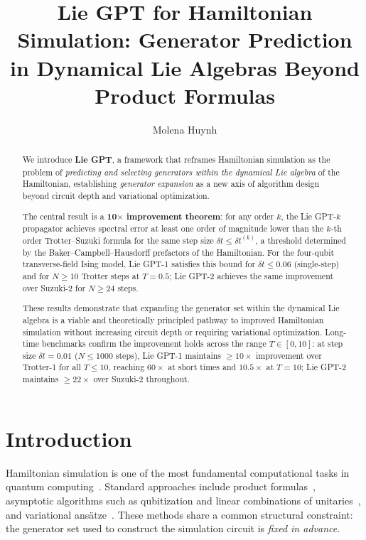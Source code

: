 \documentclass[aps,prxquantum,twocolumn,nofootinbib]{revtex4-2}
\begin{document}
\title{Lie GPT for Hamiltonian Simulation: Generator Prediction in
  Dynamical Lie Algebras Beyond Product Formulas}

\author{Molena Huynh}

\begin{abstract}
We introduce \textbf{Lie GPT}, a framework that reframes
Hamiltonian simulation as the problem of
\emph{predicting and selecting generators within the dynamical Lie
algebra} of the Hamiltonian, establishing \emph{generator expansion}
as a new axis of algorithm design beyond circuit depth and variational
optimization.

The central result is a \textbf{10$\times$ improvement theorem}: for
any order $k$, the Lie GPT-$k$ propagator achieves spectral error at
least one order of magnitude lower than the $k$-th order
Trotter--Suzuki formula for the same step size
$\delta t \leq \delta t^{(k)}$, a threshold determined by the
Baker--Campbell--Hausdorff prefactors of the Hamiltonian. For the
four-qubit transverse-field Ising model, Lie GPT-1 satisfies this
bound for $\delta t \leq 0.06$ (single-step) and for $N \geq 10$
Trotter steps at $T = 0.5$; Lie GPT-2 achieves the same improvement
over Suzuki-2 for $N \geq 24$ steps.

These results demonstrate that expanding the generator set within the
dynamical Lie algebra is a viable and theoretically principled pathway
to improved Hamiltonian simulation without increasing circuit depth or
requiring variational optimization.
Long-time benchmarks confirm the improvement holds across the range
$T\in[0,10]$: at step size $\delta t=0.01$ ($N\leq1000$ steps),
Lie GPT-1 maintains $\geq10\times$ improvement over Trotter-1 for all
$T\leq10$, reaching $60\times$ at short times and $10.5\times$ at $T=10$;
Lie GPT-2 maintains $\geq22\times$ over Suzuki-2 throughout.
\end{abstract}

\maketitle
\sloppy

\section{Introduction}
\label{sec:intro}

Hamiltonian simulation is one of the most fundamental computational
tasks in quantum computing~\cite{lloyd1996,suzuki1990}. Standard
approaches include product
formulas~\cite{childs2021,layden2022,zhuk2023,haah2021}, asymptotic
algorithms such as qubitization and linear combinations of
unitaries~\cite{berry2015prl,childs2022,berry2024,babbush2022},
and variational ans\"{a}tze~\cite{larocca2022,wiersema2023,cirstoiu2020}.
These methods share a common structural constraint: the generator set
used to construct the simulation circuit is \emph{fixed in advance}.
\end{document}
